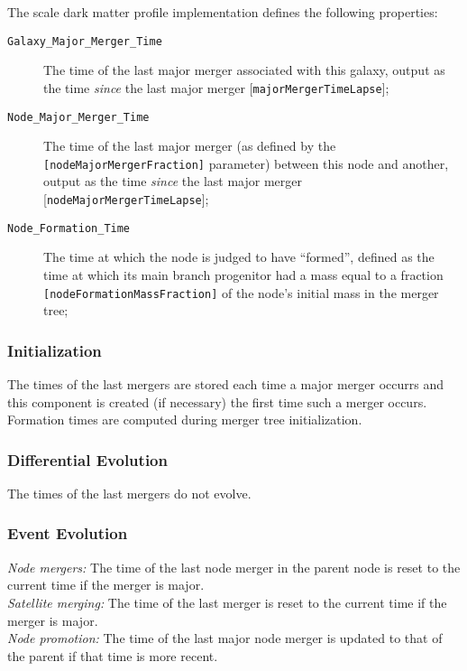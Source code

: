 The scale dark matter profile implementation defines the following properties:
\begin{description}
 \item [{\tt Galaxy\_Major\_Merger\_Time}] The time of the last major merger associated with this galaxy, output as the time \emph{since} the last major merger [{\tt majorMergerTimeLapse}];
 \item [{\tt Node\_Major\_Merger\_Time}] The time of the last major merger (as defined by the {\tt [nodeMajorMergerFraction]} parameter) between this node and another, output as the time \emph{since} the last major merger [{\tt nodeMajorMergerTimeLapse}];
 \item [{\tt Node\_Formation\_Time}] The time at which the node is judged to have ``formed'', defined as the time at which its main branch progenitor had a mass equal to a fraction {\tt [nodeFormationMassFraction]} of the node's initial mass in the merger tree;
\end{description}

\subsubsection{Initialization}

The times of the last mergers are stored each time a major merger occurrs and this component is created (if necessary) the first time such a merger occurs. Formation times are computed during merger tree initialization.

\subsubsection{Differential Evolution}

The times of the last mergers do not evolve.

\subsubsection{Event Evolution}

\noindent\emph{Node mergers:} The time of the last node merger in the parent node is reset to the current time if the merger is major.\\

\noindent\emph{Satellite merging:} The time of the last merger is reset to the current time if the merger is major.\\

\noindent\emph{Node promotion:} The time of the last major node merger is updated to that of the parent if that time is more recent.\\

